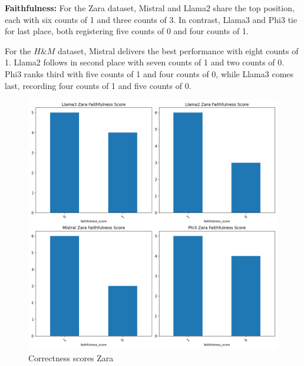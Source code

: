 \documentclass[]{article}
\begin{document}
\textbf{Faithfulness:}
For the Zara dataset, Mistral and Llama2 share the top position, each with six counts of 1 and three counts of 3. In contrast, Llama3 and Phi3 tie for last place, both registering five counts of 0 and four counts of 1.  

For the $H\&M$ dataset, Mistral delivers the best performance with eight counts of 1. Llama2 follows in second place with seven counts of 1 and two counts of 0. Phi3 ranks third with five counts of 1 and four counts of 0, while Llama3 comes last, recording four counts of 1 and five counts of 0.

\begin{figure}[H]
    \centering
    \begin{minipage}{0.49\textwidth}
        \centering
        \includegraphics[width=\textwidth]{./images/faith_zara_scene_det.png}
        \caption{Correctness scores Zara}
        \label{fig:faith_zara}
    \end{minipage}
    \hfill
    \begin{minipage}{0.49\textwidth}
        \centering

\end{minipage}
\end{figure}
\end{document}
